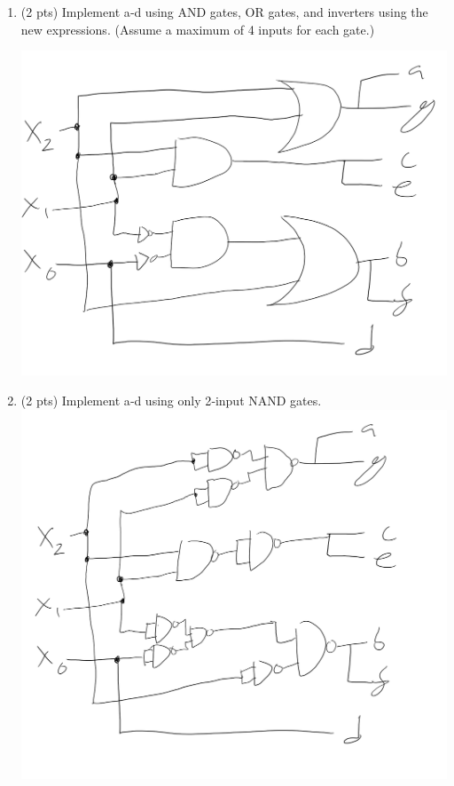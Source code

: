 \documentclass[12pt,letterpaper,titlepage]{report}
\begin{document}
\begin{raggedright}
\begin{enumerate} [label=\alph*)]
\begin{paracol}{2}
\end{paracol}
  
\item (2 pts) Implement a‐d using AND gates, OR gates, and inverters using the new expressions. (Assume a maximum of 4 inputs for each gate.) 

\includegraphics[scale=0.8]{hw5p4c}

\item (2 pts) Implement a‐d using only 2‐input NAND gates.
\includegraphics[scale=0.6]{hw5p4d}

 
\end{enumerate}
\pagebreak


\end{raggedright}
\end{document}
